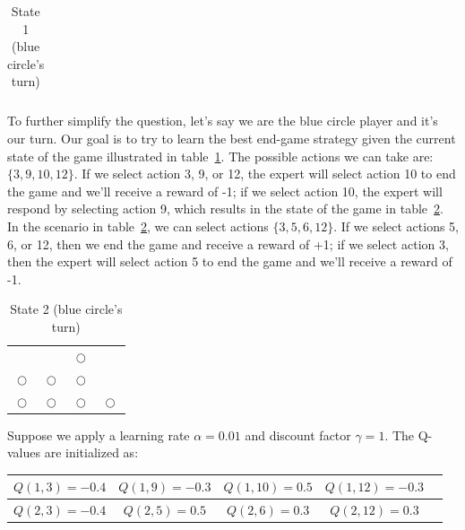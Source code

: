 \documentclass[11pt,addpoints,answers]{exam}
\def\rr{{\color{red}$\mathrel{\bigcirc}$}}
\def\bb{{\color{blue}$\mathrel{\bigcirc}$}}
\begin{document}
\begin{questions}
\begin{table}[H]
\begin{center}
\begin{tabular}{  c | c | c | c }
  \end{tabular}
 \caption{State 1 (blue circle's turn)}
 \label{table:state1}
\end{center}
\end{table}

To further simplify the question, let's say we are the blue circle player and it's our turn. Our goal is to try to learn the best end-game strategy given the current state of the game illustrated in table~\ref{table:state1}. The possible actions we can take are: $\big\{ 3, 9, 10, 12 \big\}$. If we select action 3, 9, or 12, the expert will select action 10 to end the game and we'll receive a reward of -1; if we select action 10, the expert will respond by selecting action 9, which results in the state of the game in table~\ref{table:state2}. In the scenario in table~\ref{table:state2}, we can select actions $\big\{ 3, 5, 6, 12 \big\}$. If we select actions 5, 6, or 12, then we end the game and receive a reward of +1; if we select action 3, then the expert will select action 5 to end the game and we'll receive a reward of -1.

\begin{table}[H]
\begin{center}
  \begin{tabular}{  c | c | c | c }
      &   &   &   \\ \hline
      &   & \rr &   \\ \hline
    \rr & \bb & \bb &   \\ \hline
    \rr & \bb & \bb & \rr \\ 
      
  \end{tabular}
 \caption{State 2 (blue circle's turn)}
 \label{table:state2}
\end{center}
\end{table}

Suppose we apply a learning rate $\alpha = 0.01$ and discount factor $\gamma = 1$. The Q-values are initialized as:

\begin{table}[H]
    \centering
    \def\arraystretch{1.5}%
    \begin{tabular}{|c|c|c|c|c|}
    \hline
        $Q(1, 3) = -0.4$ & $Q(1, 9) = -0.3$ & $Q(1, 10) = 0.5$ & $Q(1, 12) = -0.3$ \\ \hline
        
        $Q(2, 3) = -0.4$ & $Q(2, 5) = 0.5$ & $Q(2, 6) = 0.3$ & $Q(2, 12) = 0.3$ \\ \hline
        

\end{tabular}
\end{table}
\end{questions}
\end{document}
